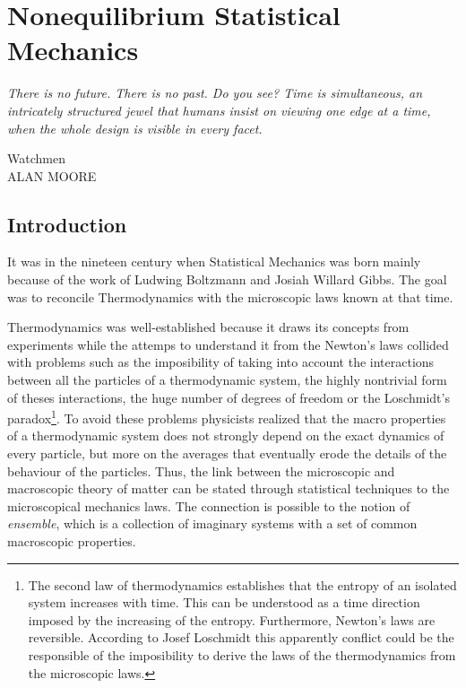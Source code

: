 \documentclass[b5paper,openright,10pt]{book}
\begin{document}
\chapter{Nonequilibrium Statistical Mechanics}
\label{Chap:NESM}
\pagestyle{chapters}  %
\epigraph{\textit{There is no future. There is no past. Do you see? Time is simultaneous, an intricately structured jewel that humans insist on viewing one edge at a time, when the whole design is visible in every facet.}}{Watchmen \\ ALAN MOORE} 

\section{Introduction}
It was in the nineteen century when Statistical Mechanics was born mainly because of the work of Ludwing Boltzmann and Josiah Willard Gibbs. The goal was to reconcile Thermodynamics with the microscopic laws known at that time. 

Thermodynamics was well-established because it draws its concepts from experiments while the attemps to understand it from the Newton's laws collided with problems such as the imposibility of taking into account the interactions between all the particles of a thermodynamic system, the highly nontrivial form of theses interactions, the huge number of degrees of freedom or the Loschmidt's paradox\footnote{The second law of thermodynamics establishes that the entropy of an isolated system increases with time. This can be understood as a time direction imposed by the increasing of the entropy. Furthermore, Newton's laws are reversible. According to Josef Loschmidt this apparently conflict could be the responsible of the imposibility to derive the laws of the thermodynamics from the microscopic laws.}. 
To avoid these problems physicists realized that the macro properties of a thermodynamic system does not strongly depend on the exact dynamics of every particle, but more on the averages that eventually erode the details of the behaviour of the particles. 
Thus, the link between the microscopic and macroscopic theory of matter can be stated through statistical techniques to the microscopical mechanics laws. 
The connection is possible to the notion of \textit{ensemble}, which is a collection of imaginary systems with a set of common macroscopic properties.  
\end{document}
